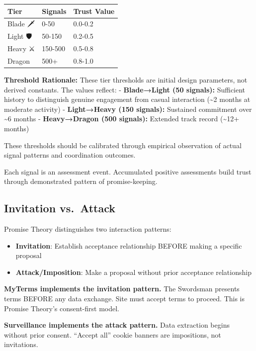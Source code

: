 \documentclass[
]{article}
\newcounter{none} %
\providecommand{\tightlist}{%
  \setlength{\itemsep}{0pt}\setlength{\parskip}{0pt}}
\begin{document}
{\def\LTcaptype{none} %
\begin{longtable}[]{@{}lll@{}}
\toprule\noalign{}
Tier & Signals & Trust Value \\
\midrule\noalign{}
\endhead
\bottomrule\noalign{}
\endlastfoot
Blade 🗡️ & 0-50 & 0.0-0.2 \\
Light 🛡️ & 50-150 & 0.2-0.5 \\
Heavy ⚔️ & 150-500 & 0.5-0.8 \\
Dragon 🐉 & 500+ & 0.8-1.0 \\
\end{longtable}
}

\textbf{Threshold Rationale:} These tier thresholds are initial design
parameters, not derived constants. The values reflect: -
\textbf{Blade→Light (50 signals):} Sufficient history to distinguish
genuine engagement from casual interaction (\textasciitilde2 months at
moderate activity) - \textbf{Light→Heavy (150 signals):} Sustained
commitment over \textasciitilde6 months - \textbf{Heavy→Dragon (500
signals):} Extended track record (\textasciitilde12+ months)

These thresholds should be calibrated through empirical observation of
actual signal patterns and coordination outcomes.

Each signal is an assessment event. Accumulated positive assessments
build trust through demonstrated pattern of promise-keeping.

\subsection{Invitation vs.~Attack}\label{invitation-vs.-attack}

Promise Theory distinguishes two interaction patterns:

\begin{itemize}
\tightlist
\item
  \textbf{Invitation}: Establish acceptance relationship BEFORE making a
  specific proposal
\item
  \textbf{Attack/Imposition}: Make a proposal without prior acceptance
  relationship
\end{itemize}

\textbf{MyTerms implements the invitation pattern.} The Swordsman
presents terms BEFORE any data exchange. Site must accept terms to
proceed. This is Promise Theory's consent-first model.

\textbf{Surveillance implements the attack pattern.} Data extraction
begins without prior consent. ``Accept all'' cookie banners are
impositions, not invitations.
\end{document}
